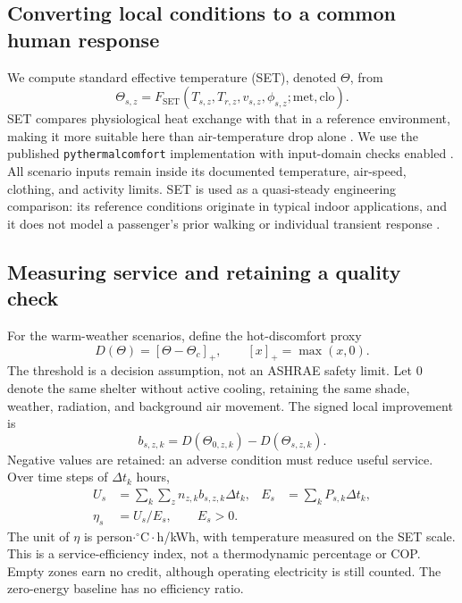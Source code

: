 \documentclass[12pt]{article}
\begin{document}
\subsection{Converting local conditions to a common human response}

We compute standard effective temperature (SET), denoted $\Theta$, from
\begin{equation}
 \Theta_{s,z}=F_{\mathrm{SET}}(T_{s,z},T_{r,z},v_{s,z},\phi_{s,z};\mathrm{met},\mathrm{clo}).
\label{eq:set}
\end{equation}
SET compares physiological heat exchange with that in a reference environment, making it more suitable here than air-temperature drop alone \cite{thermalcomfort,fanguide}. We use the published \texttt{pythermalcomfort} implementation with input-domain checks enabled \cite{pythermal}. All scenario inputs remain inside its documented temperature, air-speed, clothing, and activity limits. SET is used as a quasi-steady engineering comparison: its reference conditions originate in typical indoor applications, and it does not model a passenger's prior walking or individual transient response \cite{thermalcomfort}.

\clearpage
\subsection{Measuring service and retaining a quality check}

For the warm-weather scenarios, define the hot-discomfort proxy
\begin{equation}
 D(\Theta)=[\Theta-\Theta_c]_+,\qquad [x]_+=\max(x,0).
\end{equation}
The threshold is a decision assumption, not an ASHRAE safety limit. Let $0$ denote the same shelter without active cooling, retaining the same shade, weather, radiation, and background air movement. The signed local improvement is
\begin{equation}
 b_{s,z,k}=D(\Theta_{0,z,k})-D(\Theta_{s,z,k}).
\end{equation}
Negative values are retained: an adverse condition must reduce useful service. Over time steps of $\Delta t_k$ hours,
\begin{align}
 U_s&=\sum_k\sum_z n_{z,k}b_{s,z,k}\Delta t_k, &
 E_s&=\sum_k P_{s,k}\Delta t_k,\\
 \eta_s&=U_s/E_s,\qquad E_s>0.
\label{eq:bus-efficiency}
\end{align}
The unit of $\eta$ is person$\cdot{}^{\circ}\mathrm C\cdot$h/kWh, with temperature measured on the SET scale. This is a service-efficiency index, not a thermodynamic percentage or COP. Empty zones earn no credit, although operating electricity is still counted. The zero-energy baseline has no efficiency ratio.
\end{document}
